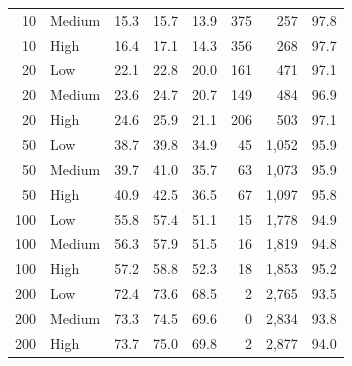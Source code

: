 \begin{table}[t]
{\begin{tabular}{rlrrrrrr}
10 & Medium & 15.3 & 15.7 & 13.9 & 375 & 257 & 97.8 \\
10 & High & 16.4 & 17.1 & 14.3 & 356 & 268 & 97.7 \\
20 & Low & 22.1 & 22.8 & 20.0 & 161 & 471 & 97.1 \\
20 & Medium & 23.6 & 24.7 & 20.7 & 149 & 484 & 96.9 \\
20 & High & 24.6 & 25.9 & 21.1 & 206 & 503 & 97.1 \\
50 & Low & 38.7 & 39.8 & 34.9 & 45 & 1,052 & 95.9 \\
50 & Medium & 39.7 & 41.0 & 35.7 & 63 & 1,073 & 95.9 \\
50 & High & 40.9 & 42.5 & 36.5 & 67 & 1,097 & 95.8 \\
100 & Low & 55.8 & 57.4 & 51.1 & 15 & 1,778 & 94.9 \\
100 & Medium & 56.3 & 57.9 & 51.5 & 16 & 1,819 & 94.8 \\
100 & High & 57.2 & 58.8 & 52.3 & 18 & 1,853 & 95.2 \\
200 & Low & 72.4 & 73.6 & 68.5 & 2 & 2,765 & 93.5 \\
200 & Medium & 73.3 & 74.5 & 69.6 & 0 & 2,834 & 93.8 \\
200 & High & 73.7 & 75.0 & 69.8 & 2 & 2,877 & 94.0 \\
\bottomrule
\end{tabular}
}
\end{table}
